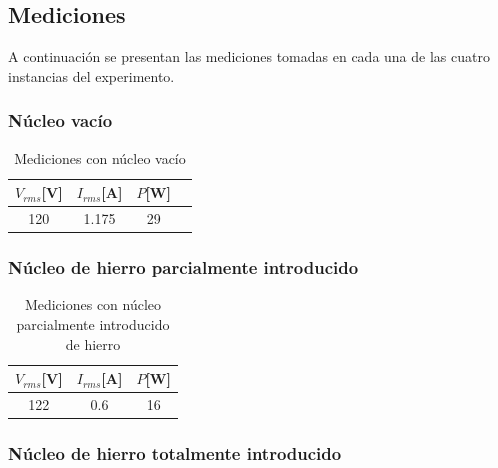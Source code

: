 \documentclass{article}
\begin{document}
        \subsection{Mediciones}
            
            A continuación se presentan las mediciones tomadas en cada una de las cuatro instancias del experimento.

            \subsubsection{Núcleo vacío}

            \begin{table}[H]
                \centering
                \begin{tabular}{|c|c|c|c|}
                    \hline
                    $V_{rms} $[V] & $I_{rms} $[A] & $P $[W]  \\ \hline
                    120           & 1.175         & 29     \\ \hline
                \end{tabular}
                \caption{Mediciones con núcleo vacío}
                \label{tab:mediciones-nucleo-vacio}
            \end{table}

            \subsubsection{Núcleo de hierro parcialmente introducido}

            \begin{table}[H]
                \centering
                \begin{tabular}{|c|c|c|}
                    \hline
                    $V_{rms} $[V] & $I_{rms} $[A] & $P $[W] \\ \hline
                    122           & 0.6         & 16    \\ \hline
                \end{tabular}
                \caption{Mediciones con núcleo parcialmente introducido de hierro}
                \label{tab:mediciones-nucleo-parcialmente-introducido-hierro}
            \end{table}

            \subsubsection{Núcleo de hierro totalmente introducido}
\end{document}
